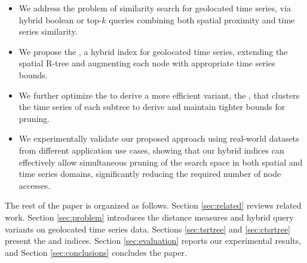 \begin{itemize}
 \item We address the problem of similarity search for geolocated time series, via hybrid boolean or top-$k$ queries combining both spatial proximity and time series similarity.
 \item We propose the \tsr, a hybrid index for geolocated time series, extending the spatial R-tree and augmenting each node with appropriate time series bounds.
 \item We further optimize the \tsr to derive a more efficient variant, the \ctsr, that clusters the time series of each subtree to derive and maintain tighter bounds for pruning.
 \item We experimentally validate our proposed approach using real-world datasets from different application use cases, showing that our hybrid indices can effectively allow simultaneous pruning of the search space in both spatial and time series domains, significantly reducing the required number of node accesses.
\end{itemize}

The rest of the paper is organized as follows. Section \ref{sec:related} reviews related work. Section \ref{sec:problem} introduces the distance measures and hybrid query variants on geolocated time series data. Sections \ref{sec:tsrtree} and \ref{sec:ctsrtree} present the \tsr and \ctsr indices. Section \ref{sec:evaluation} reports our experimental results, and Section \ref{sec:conclusions} concludes the paper.
